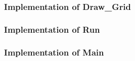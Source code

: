 \subsubsection{Implementation of Draw\_Grid}


\newpage

\subsubsection{Implementation of Run}


\subsubsection{Implementation of Main}


\newpage
